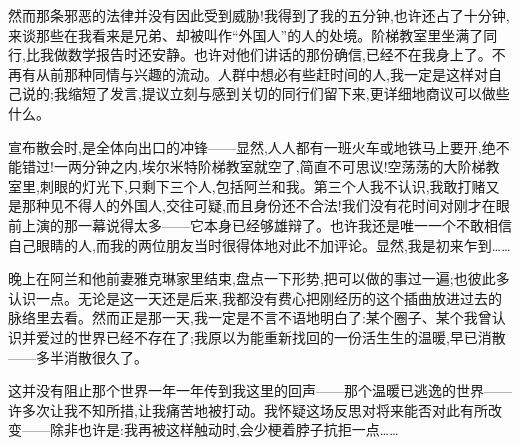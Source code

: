 然而那条邪恶的法律并没有因此受到威胁!我得到了我的五分钟,也许还占了十分钟,来谈那些在我看来是兄弟、却被叫作“外国人”的人的处境。阶梯教室里坐满了同行,比我做数学报告时还安静。也许对他们讲话的那份确信,已经不在我身上了。不再有从前那种同情与兴趣的流动。人群中想必有些赶时间的人,我一定是这样对自己说的;我缩短了发言,提议立刻与感到关切的同行们留下来,更详细地商议可以做些什么。

宣布散会时,是全体向出口的冲锋——显然,人人都有一班火车或地铁马上要开,绝不能错过!一两分钟之内,埃尔米特阶梯教室就空了,简直不可思议!空荡荡的大阶梯教室里,刺眼的灯光下,只剩下三个人,包括阿兰和我。第三个人我不认识,我敢打赌又是那种见不得人的外国人,交往可疑,而且身份还不合法!我们没有花时间对刚才在眼前上演的那一幕说得太多——它本身已经够雄辩了。也许我还是唯一一个不敢相信自己眼睛的人,而我的两位朋友当时很得体地对此不加评论。显然,我是初来乍到……

晚上在阿兰和他前妻雅克琳家里结束,盘点一下形势,把可以做的事过一遍;也彼此多认识一点。无论是这一天还是后来,我都没有费心把刚经历的这个插曲放进过去的脉络里去看。然而正是那一天,我一定是不言不语地明白了:某个圈子、某个我曾认识并爱过的世界已经不存在了;我原以为能重新找回的一份活生生的温暖,早已消散——多半消散很久了。

这并没有阻止那个世界一年一年传到我这里的回声——那个温暖已逃逸的世界——许多次让我不知所措,让我痛苦地被打动。我怀疑这场反思对将来能否对此有所改变——除非也许是:我再被这样触动时,会少梗着脖子抗拒一点……
